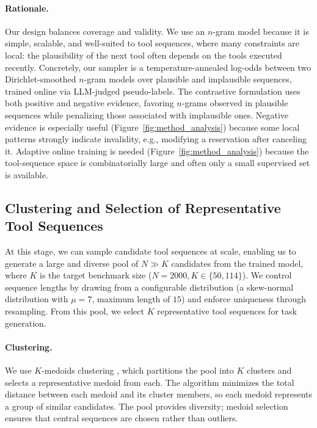 \paragraph{Rationale.}
Our design balances coverage and validity. We use an $n$-gram model because it is simple, scalable, and well-suited to tool sequences, where many constraints are local: the plausibility of the next tool often depends on the tools executed recently. Concretely, our sampler is a temperature-annealed log-odds between two Dirichlet-smoothed $n$-gram models over plausible and implausible sequences, trained online via LLM-judged pseudo-labels. The contrastive formulation uses both positive and negative evidence, favoring $n$-grams observed in plausible sequences while penalizing those associated with implausible ones. Negative evidence is especially useful (Figure~\ref{fig:method_analysis}) because some local patterns strongly indicate invalidity, e.g., modifying a reservation after canceling it. Adaptive online training is needed (Figure~\ref{fig:method_analysis}) because the tool-sequence space is combinatorially large and often only a small supervised set is available.

\subsection{Clustering and Selection of Representative Tool Sequences}
\label{sub:clustering}
At this stage, we can sample candidate tool sequences at scale, enabling us to generate a large and diverse pool of $N\!\gg\!K$ candidates from the trained model, where $K$ is the target benchmark size ($N\!=\!2000, K\in\{50, 114\}$). We control sequence lengths by drawing from a configurable distribution (a skew-normal distribution with $\mu\!=\!7$, maximum length of $15$) and enforce uniqueness through resampling. From this pool, we select $K$ representative tool sequences for task generation.

\paragraph{Clustering.} We use $K$-medoids clustering \citep{pam_kaufman1990, kmedoids}, which partitions the pool into $K$ clusters and selects a representative medoid from each. The algorithm minimizes the total distance between each medoid and its cluster members, so each medoid represents a group of similar candidates. The pool provides diversity; medoid selection ensures that central sequences are chosen rather than outliers.

